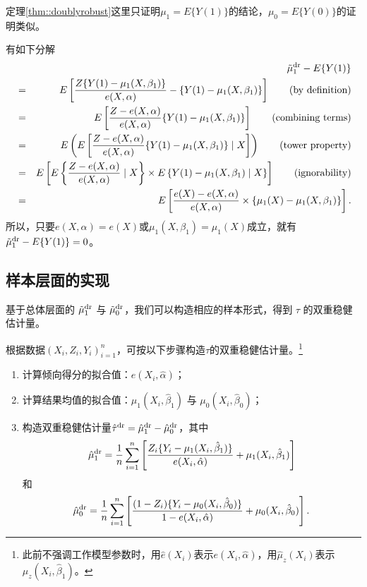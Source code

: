 \begin{myproof}{定理}{\ref{thm::doublyrobust}}这里只证明$\mu_1 = E\{  Y(1) \}$的结论，$\mu_0 = E\{  Y(0) \}$的证明类似。 


有如下分解
\begin{eqnarray*}
&&\tilde{\mu}_1^\textup{dr} - E\{  Y(1) \}     \\
&=& E\left[   \frac{Z\{ Y(1)-\mu_1(X,\beta_1) \}}{  e(X,\alpha) }   - \{ Y(1) -  \mu_1(X, \beta_1) \} \right]  
\qquad (\text{by definition})\\
&=&    E\left[   \frac{Z - e(X,\alpha) }{  e(X,\alpha) }   \{ Y(1) -  \mu_1(X, \beta_1) \} \right]  
\qquad (\text{combining terms})\\
&=&  E\left(  E\left[   \frac{Z - e(X,\alpha) }{  e(X,\alpha) }   \{ Y(1) -  \mu_1(X, \beta_1) \} \mid X \right] \right) 
\qquad (\text{tower property})\\
&=& E\left[  E\left\{   \frac{Z - e(X,\alpha) }{  e(X,\alpha) } \mid X \right\} \times E\left\{  Y(1) -  \mu_1(X, \beta_1)  \mid X \right\} \right] 
\qquad (\text{ignorability})\\
&=& E\left[   \frac{e(X) - e(X,\alpha) }{  e(X,\alpha) }  \times  \left\{  \mu_1(X) -  \mu_1(X, \beta_1)   \right\} \right]  . 
\end{eqnarray*}
所以，只要$e(X,\alpha) = e(X)$或$\mu_1(X, \beta_1) = \mu_1(X)$成立，就有$\tilde{\mu}_1^\textup{dr} - E\{  Y(1) \}  = 0$。 
\end{myproof}



 

\subsection{样本层面的实现}


基于总体层面的 $\tilde{\mu}_1^\textup{dr} $ 与 $\tilde{\mu}_0^\textup{dr} $，我们可以构造相应的样本形式，得到 $\tau$ 的双重稳健估计量。


\begin{definition}
[平均因果效应的双重稳健估计量]\label{def::dr:ace}
根据数据$(X_i, Z_i, Y_i)_{i=1}^n$，可按以下步骤构造$\tau$的双重稳健估计量。\footnote{此前不强调工作模型参数时，用$\hat e(X_i)$表示$e(X_i, \hat{\alpha})$，用$ \hat \mu_z(X_i) $表示$ \mu_z(X_i, \hat{\beta}_1) $。} 
\begin{enumerate}
[(1)]
\item
计算倾向得分的拟合值：$e(X_i, \hat{\alpha})$； 
\item
计算结果均值的拟合值：$ \mu_1(X_i, \hat{\beta}_1) $ 与 $ \mu_0(X_i, \hat{\beta}_0) $； 
\item
构造双重稳健估计量$\hat{\tau}^\textup{dr} = \hat{\mu}_1^\textup{dr}  - \hat{\mu}_0^\textup{dr}$，其中
$$
 \hat{\mu}_1^\textup{dr}  = \frac{1}{n} \sum_{i=1}^n \left[ \frac{Z_i\{ Y_i-\mu_1(X_i,\hat{\beta}_1) \}}{  e(X_i, \hat{\alpha}) }   + \mu_1(X_i, \hat{\beta}_1) \right]
$$
和
$$
 \hat{\mu}_0^\textup{dr}  = \frac{1}{n} \sum_{i=1}^n \left[  \frac{(1-Z_i)\{ Y_i-\mu_0(X_i, \hat{\beta}_0) \}}{  1-e(X_i,\hat{\alpha}) }   + \mu_0(X_i, \hat{\beta}_0)       \right] . 
$$
\end{enumerate}
\end{definition}

